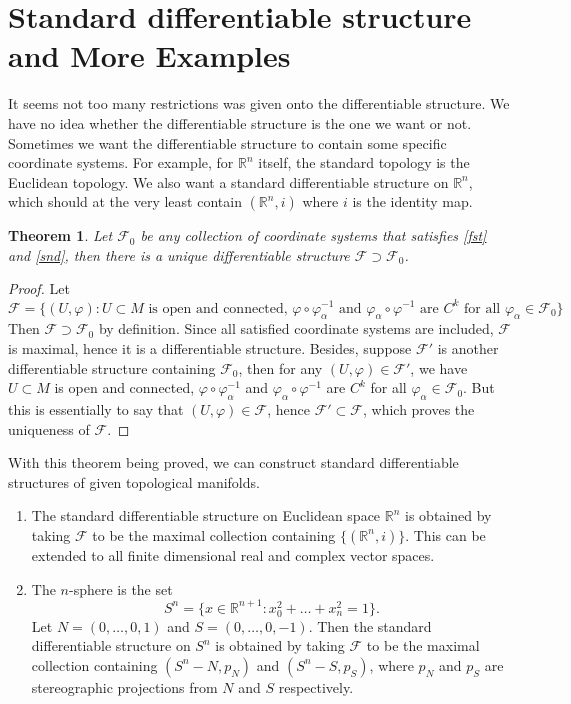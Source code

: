 \documentclass[twoside]{article}
\newtheorem{theorem}{Theorem}
\begin{document}
		\section{Standard differentiable structure and More Examples}
		It seems not too many restrictions was given onto the differentiable structure. We have no idea whether the differentiable structure is the one we want or not. Sometimes we want the differentiable structure to contain some specific coordinate systems. For example, for $\mathbb{R}^n$ itself, the standard topology is the Euclidean topology. We also want a standard differentiable structure on $\mathbb{R}^n$, which should at the very least contain $(\mathbb{R}^n,i)$ where $i$ is the identity map.
		\begin{theorem}
			Let $\mathscr{F}_0$ be any collection of coordinate systems that satisfies \ref{fst} and \ref{snd}, then there is a unique differentiable structure $\mathscr{F} \supset \mathscr{F}_0$.
		\end{theorem}
		\begin{proof}
			Let
			\[
				\mathscr{F} = \{(U,\varphi):\text{$U\subset M$ is open and connected, $\varphi \circ \varphi_\alpha^{-1}$ and $\varphi_\alpha \circ \varphi^{-1}$ are $C^k$ for all $\varphi_\alpha \in \mathscr{F}_0$}\}
			\]
			Then $\mathscr{F} \supset \mathscr{F}_0$ by definition. Since all satisfied coordinate systems are included, $\mathscr{F}$ is maximal, hence it is a differentiable structure. Besides, suppose $\mathscr{F}'$ is another differentiable structure containing $\mathscr{F}_0$, then for any $(U,\varphi) \in \mathscr{F}'$, we have $U \subset M$ is open and connected, $\varphi \circ \varphi_\alpha^{-1}$ and $\varphi_\alpha \circ \varphi^{-1}$ are $C^k$ for all $\varphi_\alpha \in \mathscr{F}_0$. But this is essentially to say that $(U,\varphi) \in \mathscr{F}$, hence $\mathscr{F}' \subset \mathscr{F}$, which proves the uniqueness of $\mathscr{F}$.
		\end{proof}
		With this theorem being proved, we can construct standard differentiable structures of given topological manifolds.
		\begin{enumerate}
			\item The standard differentiable structure on Euclidean space $\mathbb{R}^n$ is obtained by taking $\mathscr{F}$ to be the maximal collection containing $\{(\mathbb{R}^n,i)\}$. This can be extended to all finite dimensional real and complex vector spaces.
			\item The $n$-sphere is the set
			\[
				S^n = \{x \in \mathbb{R}^{n+1}:x_0^2+\dots+x_n^2=1\}.
			\]
			Let $N=(0,\dots,0,1)$ and $S = (0,\dots,0,-1)$. Then the standard differentiable structure on $S^n$ is obtained by taking $\mathscr{F}$ to be the maximal collection containing $(S^n-N,p_N)$ and $(S^n-S,p_S)$, where $p_N$ and $p_S$ are stereographic projections from $N$ and $S$ respectively. 
		\end{enumerate}
\end{document}
